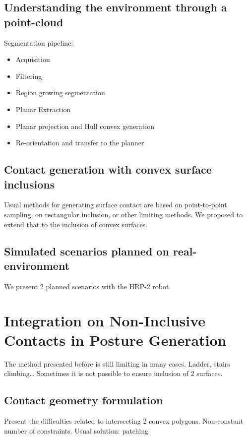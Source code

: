 \subsection{Understanding the environment through a point-cloud}
Segmentation pipeline:
\begin{itemize}
  \item Acquisition
  \item Filtering
  \item Region growing segmentation
  \item Planar Extraction
  \item Planar projection and Hull convex generation
  \item Re-orientation and transfer to the planner
\end{itemize}

\subsection{Contact generation with convex surface inclusions}
Usual methods for generating surface contact are based on point-to-point sampling, on rectangular inclusion, or other limiting methods. We proposed to extend that to the inclusion of convex surfaces.

\subsection{Simulated scenarios planned on real-environment}
We present 2 planned scenarios with the HRP-2 robot




\section{Integration on Non-Inclusive Contacts in Posture Generation}

The method presented before is still limiting in many cases. Ladder, stairs climbing\dots
Sometimes it is not possible to ensure inclusion of 2 surfaces.

\subsection{Contact geometry formulation}
\label{sec:background}
Present the difficulties related to intersecting 2 convex polygons. Non-constant number of constraints.
Usual solution: patching


